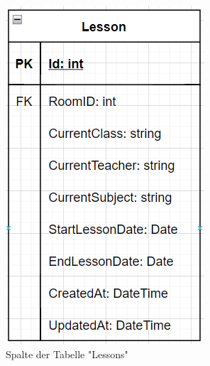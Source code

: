 \begin{figure}[H]
    \centering
    \includegraphics{media/MariaDB/Lesson.png}
    \caption{Spalte der Tabelle "Lessons"}
\end{figure}
